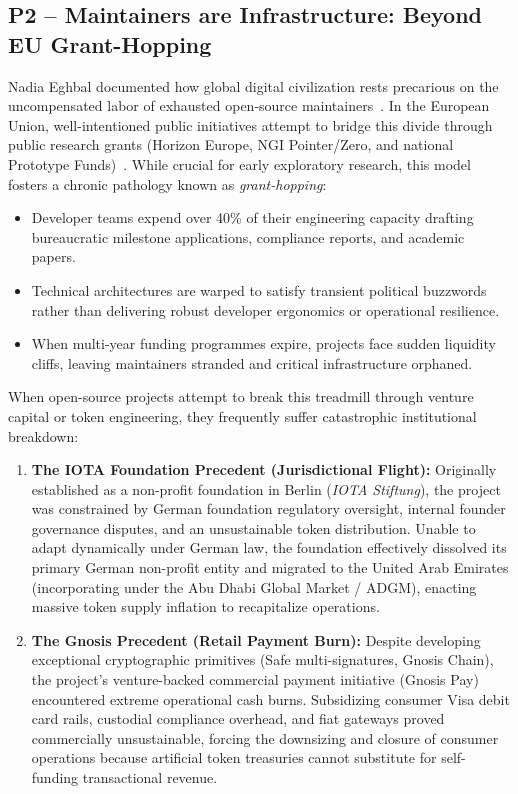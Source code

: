 \documentclass[a4paper,11pt,twoside,parskip=half-,headings=small]{scrartcl}
\begin{document}
\subsection{P2 -- Maintainers are Infrastructure: Beyond EU Grant-Hopping}

Nadia Eghbal documented how global digital civilization rests precarious on the
uncompensated labor of exhausted open-source maintainers~\cite{eghbal2016}. In the
European Union, well-intentioned public initiatives attempt to bridge this divide
through public research grants (Horizon Europe, NGI Pointer/Zero, and national
Prototype Funds)~\cite{ngireport2023}. While crucial for early exploratory research,
this model fosters a chronic pathology known as \emph{grant-hopping}:
\begin{itemize}
  \item Developer teams expend over 40\% of their engineering capacity drafting
bureaucratic milestone applications, compliance reports, and academic papers.
  \item Technical architectures are warped to satisfy transient political buzzwords
rather than delivering robust developer ergonomics or operational resilience.
  \item When multi-year funding programmes expire, projects face sudden liquidity
cliffs, leaving maintainers stranded and critical infrastructure orphaned.
\end{itemize}

When open-source projects attempt to break this treadmill through venture capital
or token engineering, they frequently suffer catastrophic institutional breakdown:
\begin{enumerate}
  \item \textbf{The IOTA Foundation Precedent (Jurisdictional Flight):} Originally
established as a non-profit foundation in Berlin (\emph{IOTA Stiftung}), the
project was constrained by German foundation regulatory oversight, internal
founder governance disputes, and an unsustainable token distribution. Unable
to adapt dynamically under German law, the foundation effectively dissolved
its primary German non-profit entity and migrated to the United Arab Emirates
(incorporating under the Abu Dhabi Global Market / ADGM), enacting massive
token supply inflation to recapitalize operations.
  \item \textbf{The Gnosis Precedent (Retail Payment Burn):} Despite developing
exceptional cryptographic primitives (Safe multi-signatures, Gnosis Chain),
the project's venture-backed commercial payment initiative (Gnosis Pay)
encountered extreme operational cash burns. Subsidizing consumer Visa debit
card rails, custodial compliance overhead, and fiat gateways proved commercially
unsustainable, forcing the downsizing and closure of consumer operations
because artificial token treasuries cannot substitute for self-funding
transactional revenue.
\end{enumerate}
\end{document}
